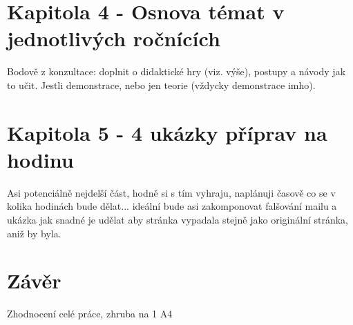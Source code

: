 \documentclass[a4paper, 11pt]{article}
\begin{document}
\section{Kapitola 4 - Osnova témat v jednotlivých ročnících}
Bodově z konzultace: doplnit o didaktické hry (viz. výše), postupy a návody jak to učit. Jestli demonstrace, nebo jen teorie (vždycky demonstrace imho).

\section{Kapitola 5 - 4 ukázky příprav na hodinu}
Asi potenciálně nejdelší část, hodně si s tím vyhraju, naplánuji časově co se v kolika hodinách bude dělat... ideální bude asi zakomponovat falšování mailu a ukázka jak snadné je udělat aby stránka vypadala stejně jako originální stránka, aniž by byla.

\section{Závěr}
Zhodnocení celé práce, zhruba na 1 A4
\end{document}
